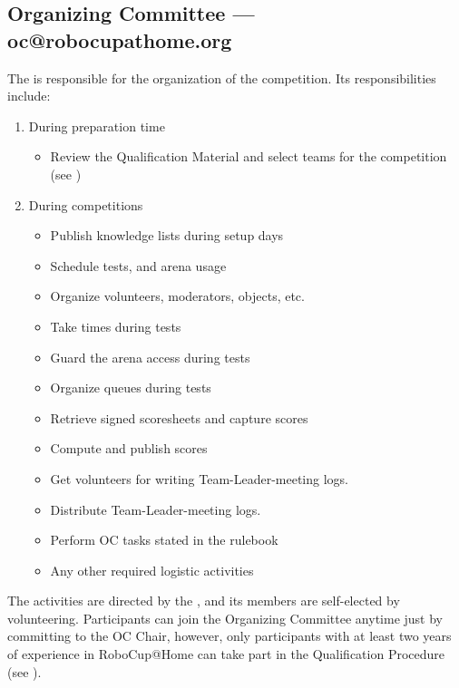 %
%
\subsection{Organizing Committee --- oc@robocupathome.org}
\label{sec:oc}
The  is responsible for the organization of the competition. Its responsibilities include:

\begin{enumerate}
  \item During preparation time
  \begin{itemize}
    \item Review the Qualification Material and select teams for the competition (see )
  \end{itemize}
  \item During competitions
  \begin{itemize}
    \item Publish knowledge lists during setup days
    \item Schedule tests, and arena usage
    \item Organize volunteers, moderators, objects, etc.
    \item Take times during tests
    \item Guard the arena access during tests
    \item Organize queues during tests
    \item Retrieve signed scoresheets and capture scores
    \item Compute and publish scores
    \item Get volunteers for writing Team-Leader-meeting logs.
    \item Distribute Team-Leader-meeting logs.
    \item Perform OC tasks stated in the rulebook
    \item Any other required logistic activities
  \end{itemize}
\end{enumerate}

The  activities are directed by the , and its members are self-elected by volunteering. Participants can join the Organizing Committee anytime just by committing to the OC Chair, however, only participants with at least two years of experience in RoboCup@Home can take part in the Qualification Procedure (see ).

